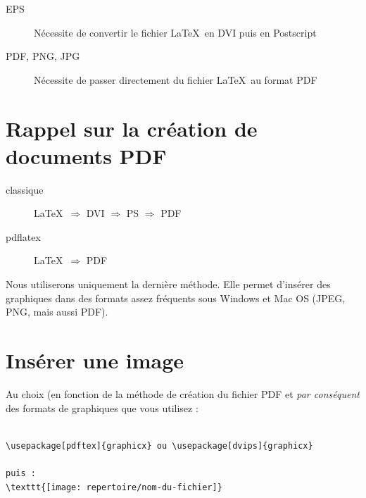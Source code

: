 \begin{description}
\item[EPS] Nécessite de convertir le fichier \LaTeX\ en DVI puis en
  Postscript
\item[PDF, PNG, JPG] Nécessite de passer directement du fichier
  \LaTeX\ au format PDF
\end{description}

\vfill

\section{Rappel sur la création de documents PDF}

\vfill{}

\begin{description}
\item[classique] \LaTeX\ $\Rightarrow$ DVI $\Rightarrow$ PS $\Rightarrow$ PDF
\item[pdflatex] \LaTeX\ $\Rightarrow$ PDF
\end{description}

Nous utiliserons uniquement la dernière méthode. Elle permet d'insérer
des graphiques dans des formats assez fréquents sous Windows et Mac OS
(JPEG, PNG, mais aussi PDF).


\vfill{}

\section{Insérer une image}
\label{includegraphics}

\vfill

\begin{boxedminipage}{\textwidth}
  Au choix (en fonction de la méthode de création du fichier PDF et
  \emph{par conséquent} des formats de graphiques que vous utilisez :
\begin{verbatim}

\usepackage[pdftex]{graphicx} ou \usepackage[dvips]{graphicx}

puis :
\texttt{[image: repertoire/nom-du-fichier]}

\end{verbatim}
\end{boxedminipage}

